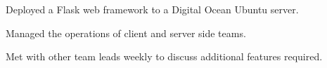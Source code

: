 \documentclass[letterpaper]{deedy-resume} %
\begin{document}
\begin{minipage}[t]{0.71\textwidth}
\sectionspace %



\begin{tightitemize}
\item Deployed a Flask web framework to a Digital Ocean Ubuntu server.
\item Managed the operations of client and server side teams.
\item Met with other team leads weekly to discuss additional features required.
\end{tightitemize}





\sectionspace %






\end{minipage}
\end{document}
